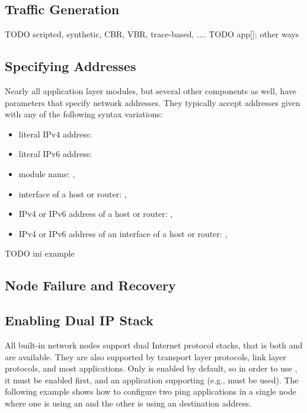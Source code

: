 
\subsection{Traffic Generation}

TODO scripted, synthetic, CBR, VBR, trace-based, .... 
TODO app[]; other ways 

\subsection{Specifying Addresses}

Nearly all application layer modules, but several other components as well,
have parameters that specify network addresses. They typically accept
addresses given with any of the following syntax variations:

\begin{itemize}
  \item literal IPv4 address: 
  \item literal IPv6 address: 
  \item module name: , 
  \item interface of a host or router: , 
  \item IPv4 or IPv6 address of a host or router: ,
  \item IPv4 or IPv6 address of an interface of a host or router:
      , 
\end{itemize}

TODO ini example


\subsection{Node Failure and Recovery}

\subsection{Enabling Dual IP Stack}

All built-in network nodes support dual Internet protocol stacks, that is
both  and  are available. They are also
supported by transport layer protocols, link layer protocols, and most
applications. Only  is enabled by default, so in order to
use , it must be enabled first, and an application
supporting  (e.g.,  must be used). The
following example shows how to configure two ping applications in a single
node where one is using an  and the other is using an
 destination address.


